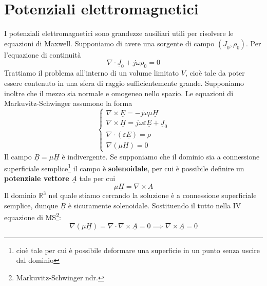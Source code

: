\documentclass{book}
\begin{document}
         \section{Potenziali elettromagnetici}
            I potenziali elettromagnetici sono grandezze ausiliari utili per risolvere le equazioni di Maxwell. Supponiamo di avere una sorgente di campo $(\underline{J}_{0}, \rho_{0})$. Per l'equazione di
            continuità
            \begin{equation}
                \nabla \cdot \underline{J}_{0}+ j \omega \rho_{0} = 0
            \end{equation}
            Trattiamo il problema all'interno di un volume limitato $V$, cioè tale da poter essere contenuto in una sfera di raggio sufficientemente grande. Supponiamo inoltre che il mezzo sia normale e omogeneo
            nello spazio. Le equazioni di Markuvitz-Schwinger assumono la forma
            \begin{equation}
                \begin{cases}
                    \displaystyle \nabla \times \underline{E} = -j \omega \mu \underline{H} \\
                    \displaystyle \nabla \times \underline{H} = j \omega \varepsilon \underline{E}+\underline{J}_{0} \\
                    \nabla \cdot (\varepsilon \underline{E}) = \rho \\
                    \nabla (\mu \underline{H}) = 0
                \end{cases}
            \end{equation}
            Il campo $\underline{B}= \mu \underline{H}$ è indivergente. Se supponiamo che il dominio sia a connessione superficiale semplice\footnote{cioè tale per cui è possibile deformare una superficie in un punto senza uscire dal dominio}
            il campo è \textbf{solenoidale}, per cui è possibile definire un \textbf{potenziale vettore} $\underline{A}$ tale per cui
            \begin{equation}
                \mu \underline{H} = \nabla \times \underline{A}
            \end{equation}
            Il dominio $\mathbb{R} ^{3}$ nel quale stiamo cercando la soluzione è a connessione superficiale semplice, dunque $\underline{B}$ è sicuramente solenoidale.
            Sostituendo il tutto nella IV equazione di MS\footnote{Markuvitz-Schwinger ndr.}:
            \begin{equation}
                \nabla (\mu \underline{H}) = \nabla \cdot \nabla \times \underline{A} = 0 \implies \nabla \times \underline{A} = 0
            \end{equation}
\end{document}
